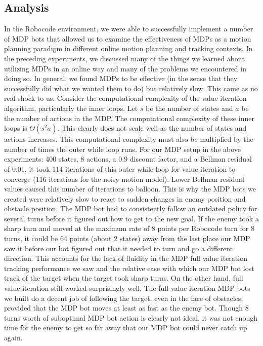 \documentclass{aiaa-tc}%
\begin{document}
\subsection{Analysis}
In the Robocode environment, we were able to successfully implement a number of MDP bots that allowed us to examine the effectiveness of MDPs as a motion planning paradigm in different online motion planning and tracking contexts. In the preceding experiments, we discussed many of the things we learned about utilizing MDPs in an online way and many of the problems we encountered in doing so. In general, we found MDPs to be effective (in the sense that they successfully did what we wanted them to do) but relatively slow. This came as no real shock to us. Consider the computational complexity of the value iteration algorithm, particularly the inner loops. Let $s$ be the number of states and $a$ be the number of actions in the MDP. The computational complexity of these inner loops is $\Theta(s^2a)$. This clearly does not scale well as the number of states and actions increases. This computational complexity must also be multiplied by the number of times the outer while loop runs. For our MDP setup in the above experiments: 400 states, 8 actions, a 0.9 discount factor, and a Bellman residual of 0.01, it took 114 iterations of this outer while loop for value iteration to converge (116 iterations for the noisy motion model). Lower Bellman residual values caused this number of iterations to balloon. This is why the MDP bots we created were relatively slow to react to sudden changes in enemy position and obstacle position. The MDP bot had to consistently follow an outdated policy for several turns before it figured out how to get to the new goal. If the enemy took a sharp turn and moved at the maximum rate of 8 points per Robocode turn for 8 turns, it could be 64 points (about 2 states) away from the last place our MDP saw it before our bot figured out that it needed to turn and go a different direction. This accounts for the lack of fluidity in the MDP full value iteration tracking performance we saw and the relative ease with which our MDP bot lost track of the target when the target took sharp turns. On the other hand, full value iteration still worked surprisingly well. The full value iteration MDP bots we built do a decent job of following the target, even in the face of obstacles, provided that the MDP bot moves at least as fast as the enemy bot. Though 8 turns worth of suboptimal MDP bot action is clearly not ideal, it was not enough time for the enemy to get so far away that our MDP bot could never catch up again.  \\ \\
\end{document}
